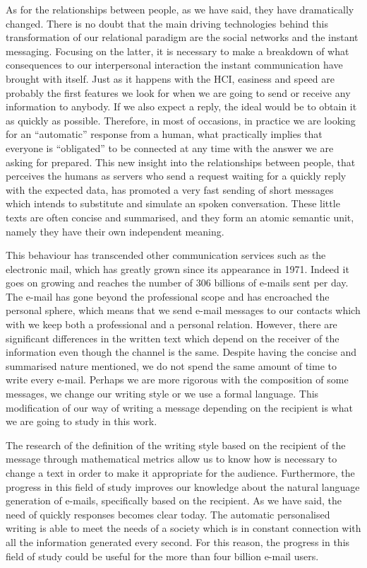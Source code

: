 As for the relationships between people, as we have said, they have dramatically changed. There is no doubt that the main driving technologies behind this transformation of our relational paradigm are the social networks and the instant messaging. Focusing on the latter, it is necessary to make a breakdown of what consequences to our interpersonal interaction the instant communication have brought with itself. Just as it happens with the HCI, easiness and speed are probably the first features we look for when we are going to send or receive any information to anybody. If we also expect a reply, the ideal would be to obtain it as quickly as possible. Therefore, in most of occasions, in practice we are looking for an ``automatic'' response from a human, what practically implies that everyone is ``obligated'' to be connected at any time with the answer we are asking for prepared. This new insight into the relationships between people, that perceives the humans as servers who send a request waiting for a quickly reply with the expected data, has promoted a very fast sending of short messages which intends to substitute and simulate an spoken conversation. These little texts are often concise and summarised, and they form an atomic semantic unit, namely they have their own independent meaning.

This behaviour has transcended other communication services such as the electronic mail, which has greatly grown since its appearance in 1971. Indeed it goes on growing and reaches the number of 306 billions of e-mails sent per day. The e-mail has gone beyond the professional scope and has encroached the personal sphere, which means that we send e-mail messages to our contacts which with we keep both a professional and a personal relation. However, there are significant differences in the written text which depend on the receiver of the information even though the channel is the same. Despite having the concise and summarised nature mentioned, we do not spend the same amount of time to write every e-mail. Perhaps we are more rigorous with the composition of some messages, we change our writing style or we use a formal language. This modification of our way of writing a message depending on the recipient is what we are going to study in this work.

The research of the definition of the writing style based on the recipient of the message through mathematical metrics allow us to know how is necessary to change a text in order to make it appropriate for the audience. Furthermore, the progress in this field of study improves our knowledge about the natural language generation of e-mails, specifically based on the recipient. As we have said, the need of quickly responses becomes clear today. The automatic personalised writing is able to meet the needs of a society which is in constant connection with all the information generated every second. For this reason, the progress in this field of study could be useful for the more than four billion e-mail users.

